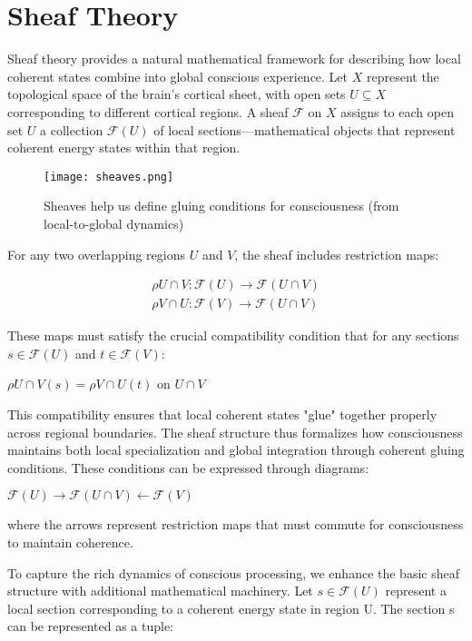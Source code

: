 \section{Sheaf Theory}

Sheaf theory provides a natural mathematical framework for describing how local coherent states combine into global conscious experience. Let $X$ represent the topological space of the brain's cortical sheet, with open sets $U \subseteq X$ corresponding to different cortical regions. A sheaf $\mathcal{F}$ on $X$ assigns to each open set $U$ a collection $\mathcal{F}(U)$ of local sections—mathematical objects that represent coherent energy states within that region.

\begin{figure}[h]
    \centering
    \texttt{[image: sheaves.png]}

    \caption{Sheaves help us define gluing conditions for consciousness (from local-to-global dynamics)}
\end{figure}

For any two overlapping regions $U$ and $V$, the sheaf includes restriction maps:

\begin{align}
\rho U \cap V: \mathcal{F}(U) \rightarrow \mathcal{F}(U \cap V)
\\
\rho V \cap U: \mathcal{F}(V) \rightarrow \mathcal{F}(U \cap V)
\end{align}


These maps must satisfy the crucial compatibility condition that for any sections $s \in \mathcal{F}(U)$ and $t \in \mathcal{F}(V)$:

$\rho U \cap V(s) = \rho V \cap U(t)$ on $U \cap V$

This compatibility ensures that local coherent states "glue" together properly across regional boundaries. The sheaf structure thus formalizes how consciousness maintains both local specialization and global integration through coherent gluing conditions. These conditions can be expressed through diagrams:

$\mathcal{F}(U) \rightarrow \mathcal{F}(U \cap V) \leftarrow \mathcal{F}(V)$

where the arrows represent restriction maps that must commute for consciousness to maintain coherence.

To capture the rich dynamics of conscious processing, we enhance the basic sheaf structure with additional mathematical machinery. Let $s \in \mathcal{F}(U)$ represent a local section corresponding to a coherent energy state in region U. The section s can be represented as a tuple:

